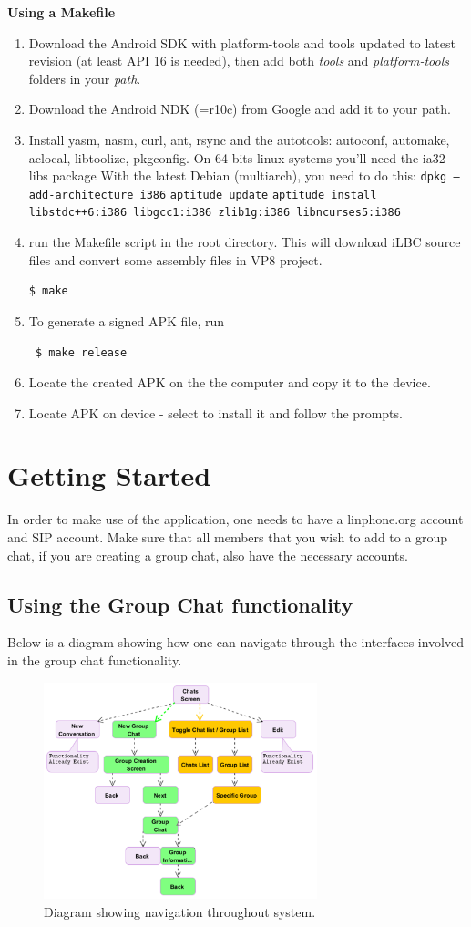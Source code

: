 \documentclass[11pt]{article}
\begin{document}
\textbf{Using a Makefile}
\begin{enumerate}
\item Download the Android SDK with platform-tools and tools updated to latest revision (at least API 16 is needed), then add both \textit{tools} and \textit{platform-tools} folders in your \textit{path}.
\item Download the Android NDK (=r10c) from Google and add it to your path.
\item Install yasm, nasm, curl, ant, rsync and the autotools: autoconf, automake, aclocal, libtoolize, pkgconfig.
\subitem On 64 bits linux systems you'll need the ia32-libs package
\subitem With the latest Debian (multiarch), you need to do this:
\subsubitem \texttt{dpkg --add-architecture i386}
\subsubitem \texttt{aptitude update}
\subsubitem \texttt{aptitude install libstdc++6:i386 libgcc1:i386 zlib1g:i386 libncurses5:i386}
\item run the Makefile script in the root directory. This will download iLBC source files and convert some assembly files in VP8 project.
\begin{verbatim}$ make \end{verbatim}
\item To generate a signed APK file, run  \begin{verbatim} $ make release \end{verbatim}
\item Locate the created APK on the the computer and copy it to the device. 
\item Locate APK on device - select to install it and follow the prompts.
\end{enumerate}

\section{Getting Started}
In order to make use of the application, one needs to have a linphone.org account and SIP account. Make sure that all members that you wish to add to a group chat, if you are creating a group chat, also have the necessary accounts.
\subsection{Using the Group Chat functionality}
Below is a diagram showing how one can navigate through the interfaces involved in the group chat functionality.
\begin{figure}[H]
\includegraphics[width=300px]{./images/flow.png}
 \caption{Diagram showing navigation throughout system.}
 \label{flow}
 \end{figure}
\end{document}
